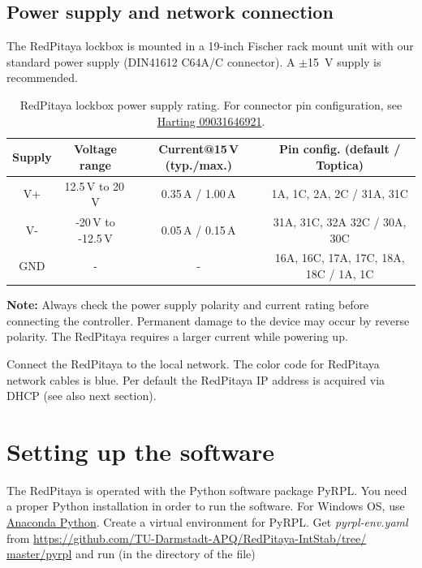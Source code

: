 \documentclass[twoside,a4paper]{refart}
\begin{document}
\subsection{Power supply and network connection}
The RedPitaya lockbox is mounted in a 19-inch Fischer rack mount unit with our standard power supply (DIN41612 C64A/C connector). A $\pm$\SI{15}{\volt} supply is recommended. 

\begin{maxipage}
	\centering
	\begin{table}[H]
		{\small
		\begin{tabular}{|c|c|c|c|}\hline
			\textbf{Supply} & \textbf{Voltage range} & \textbf{Current@15\,V (typ./max.)}	& \textbf{Pin config. (default / Toptica)}  \\\hline
			V+			& 12.5\,V to 20\,V		& 	 0.35\,A / 1.00\,A					& 1A, 1C, 2A, 2C	/  31A, 31C	 \\\hline	
			V-			& -20\,V to -12.5\,V 	&		0.05\,A / 0.15\,A					& 31A, 31C, 32A 32C	/ 30A, 30C\\\hline	 
			GND			& -					&	-										& 16A, 16C, 17A, 17C, 18A, 18C  /  1A, 1C              \\\hline
		\end{tabular}
	}
		\caption{RedPitaya lockbox power supply rating. For connector pin configuration, see \href{https://b2b.harting.com/files/download/PRD/PDF_TS/0903164X921_100072506DRW176A.pdf}{Harting 09031646921}. \label{tab:power}}
	\end{table}
\end{maxipage}

\textbf{Note:} Always check the power supply polarity and current rating before connecting the controller. Permanent damage to the device may occur by reverse polarity. The RedPitaya requires a larger current while powering up.

 Connect the RedPitaya to the local network. The color code for RedPitaya network cables is blue. Per default the RedPitaya IP address is acquired via DHCP (see also next section). 

\section{Setting up the software}

The RedPitaya is operated with the Python software package PyRPL. You need a proper Python installation in order to run the software. For Windows OS, use \href{https://www.anaconda.com/}{Anaconda Python}. Create a virtual environment for PyRPL. Get \textit{pyrpl-env.yaml} from \href{https://github.com/TU-Darmstadt-APQ/RedPitaya-IntStab/tree/master/pyrpl}{https://github.com/TU-Darmstadt-APQ/RedPitaya-IntStab/tree/ master/pyrpl} and run (in the directory of the file)
\end{document}
